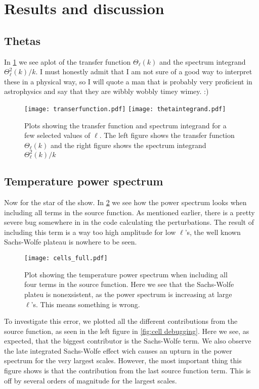 \documentclass[12pt]{article}
\begin{document}
\section{Results and discussion}
\subsection{Thetas}

In \cref{fig:thetas} we see aplot of the transfer function $\Theta_{\ell}(k)$ and the spectrum integrand $\Theta_{\ell}^2(k)/k$. I must honestly admit that I am not sure of a good way to interpret these in a physical way, so I will quote a man that is probably very proficient in astrophysics and say that they are wibbly wobbly timey wimey. :)

\begin{figure}[h]
    \centering
    \texttt{[image: transerfunction.pdf]}
    \texttt{[image: thetaintegrand.pdf]}  
    \caption{Plots showing the transfer function and spectrum integrand for a few selected values of $\ell$. The left figure shows the transfer function $\Theta_{\ell}(k)$ and the right figure shows the spectrum integrand $\Theta_{\ell}^2(k)/k$ }
    \label{fig:thetas}
\end{figure}


\subsection{Temperature power spectrum}

Now for the star of the show. In \cref{fig:cell full} we see how the power spectrum looks when including all terms in the source function. As mentioned earlier, there is a pretty severe bug somewhere in in the code calculating the perturbations. The result of including this term is a way too high amplitude for low $\ell$'s, the well known Sachs-Wolfe plateau is nowhere to be seen. 

\begin{figure}[h]
    \centering
    \texttt{[image: cells\_full.pdf]} 
    \caption{Plot showing the temperature power spectrum when including all four terms in the source function. Here we see that the Sachs-Wolfe plateu is nonexsistent, as the power spectrum is increasing at large $\ell$'s. This means something is wrong.}
    \label{fig:cell full}
\end{figure}

To investigate this error, we plotted all the different contributions from the source function, as seen in the left figure in \cref{fig:cell debugging}. Here we see, as expected, that the biggest contributor is the Sachs-Wolfe term. We also observe the late integrated Sachs-Wolfe effect wich causes an upturn in the power spectrum for the very largest scales. However, the most important thing this figure shows is that the contribution from the last source function term. This is off by several orders of magnitude for the largest scales. 
\end{document}
